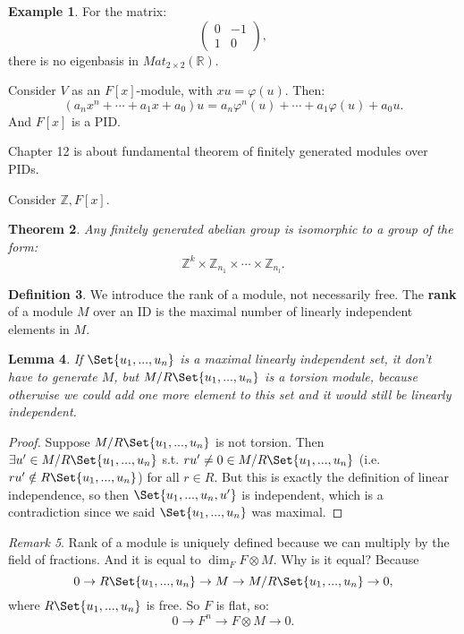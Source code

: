 \documentclass[9pt,reqno,twoside]{amsbook}
\theoremstyle{plain}
\newtheorem{theorem}{Theorem}[chapter]
\numberwithin{section}{chapter}
\numberwithin{equation}{chapter}
\newtheorem{lem}[theorem]{Lemma}
\theoremstyle{definition}
\newtheorem{Def}[theorem]{Definition}
\newtheorem{Ex}[theorem]{Example}
\theoremstyle{remark}
\newtheorem{rem}[theorem]{Remark}
\theoremstyle{plain}
\newcommand{\R}{\mathbb{R}}
\newcommand{\z}{\mathbb{Z}}
\newcommand{\bb}{\vspace{3mm}}
\newcommand{\tens}{\otimes}
\newcommand{\lpar}{\left(}
\newcommand{\rpar}{\right)}
\renewcommand{\phi}{\varphi}
\begin{document}
\begin{Ex}
For the matrix:
$$
\lpar 
\begin{matrix}
0 & -1\\
1 & 0
\end{matrix} \rpar,
$$
there is no eigenbasis in $Mat_{2 \times 2}(\R)$. 
\end{Ex}

Consider $V$ as an $F[x]$-module, with $xu = \phi(u)$. Then:
$$
(a_nx^n + \cdots + a_1x + a_0)u = a_n\phi^n(u) + \cdots + a_1 \phi(u) + a_0u.
$$
And $F[x]$ is a PID. 

\bb\bb
Chapter 12 is about fundamental theorem of finitely generated modules over PIDs. 

Consider $\z,F[x]$. 

\begin{theorem}
Any finitely generated abelian group is isomorphic to a group of the form:
$$
\z^k \times \z_{n_1} \times \cdots \times \z_{n_l}.
$$
\end{theorem}

\begin{Def}
We introduce the rank of a module, not necessarily free. The \textbf{rank} of a module $M$ over an ID is the maximal number of linearly independent elements in $M$. 
\end{Def}

\begin{lem}
If $\Set{u_1,...,u_n}$ is a maximal linearly independent set, it don't have to generate $M$, but $M/R\Set{u_1,...,u_n}$ is a torsion module, because otherwise we could add one more element to this set and it would still be linearly independent. 
\end{lem}

\begin{proof}
Suppose $M/R\Set{u_1,...,u_n}$ is not torsion. Then $\exists u' \in M/R\Set{u_1,...,u_n}$ s.t. $ru' \neq 0 \in M/R\Set{u_1,...,u_n}$ (i.e. $ru' \notin R\Set{u_1,...,u_n}$) for all $r \in R$. But this is exactly the definition of linear independence, so then $\Set{u_1,...,u_n,u'}$ is independent, which is a contradiction since we said $\Set{u_1,...,u_n}$ was maximal. 
\end{proof}

\begin{rem}
Rank of a module is uniquely defined because we can multiply by the field of fractions. And it is equal to $\dim_FF \tens M$. Why is it equal? Because 
$$
0 \to R\Set{u_1,...,u_n} \to M \to M/R\Set{u_1,...,u_n} \to 0,
$$
where $R\Set{u_1,...,u_n}$ is free. So $F$ is flat, so:
$$
0 \to F^n \to F\tens M \to 0.
$$
\end{rem}
\end{document}
